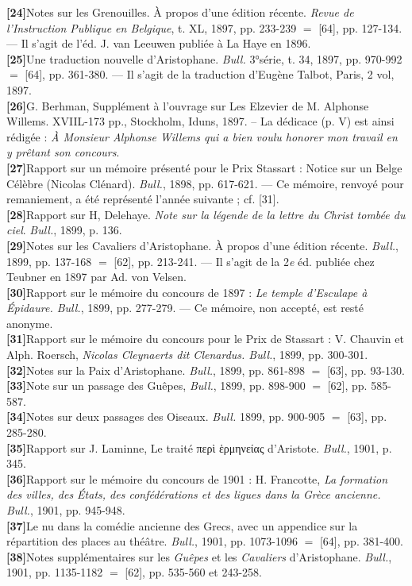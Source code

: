 \documentclass{book}%
\newcommand{\italique}[1]{\textit{#1}}%
\newcommand{\nieme}[1]{#1\italique{e}}%
\newcommand{\biblio}[2]{\hspace*{-1.5cm}\textbf{[#1]}\hspace*{1.5cm}#2\\

}
\begin{document}
\biblio{24}{Notes sur les Grenouilles. À propos d'une édition récente. \italique{Revue de l'Instruction Publique en Belgique}, t. XL, 1897, pp. 233-239 $=$ [64], pp. 127-134. — Il s'agit de l'éd. J. van Leeuwen publiée à La Haye en 1896.}%
\biblio{25}{Une traduction nouvelle d'Aristophane. \italique{Bull.} 3°série, t. 34, 1897, pp. 970-992 $=$ [64], pp. 361-380. — Il s'agit de la traduction d'Eugène Talbot, Paris, 2 vol, 1897.}%
\biblio{26}{G. Berhman, Supplément à l'ouvrage sur Les Elzevier de M. Alphonse Willems. XVIIL-173 pp., Stockholm, Iduns, 1897. -- La dédicace (p. V) est ainsi rédigée : \italique{À Monsieur Alphonse Willems qui a bien voulu honorer mon travail en y prêtant son concours}.}%
\biblio{27}{Rapport sur un mémoire présenté pour le Prix Stassart : Notice sur un Belge Célèbre (Nicolas Clénard). \italique{Bull.}, 1898, pp. 617-621. — Ce mémoire, renvoyé pour remaniement, a été représenté l'année suivante ; cf. [31].}%
\biblio{28}{Rapport sur H, Delehaye. \italique{Note sur la légende de la lettre du Christ tombée du ciel}. \italique{Bull.}, 1899, p. 136.}%
\biblio{29}{Notes sur les Cavaliers d'Aristophane. À propos d'une édition récente. \italique{Bull.}, 1899, pp. 137-168 $=$ [62], pp. 213-241. — Il s'agit de la \nieme{2} éd. publiée chez Teubner en 1897 par Ad. von Velsen.}%
\biblio{30}{Rapport sur le mémoire du concours de 1897 : \italique{Le temple d'Esculape à Épidaure. Bull.}, 1899, pp. 277-279. — Ce mémoire, non accepté, est resté anonyme.}%
\biblio{31}{Rapport sur le mémoire du concours pour le Prix de Stassart : V. Chauvin et Alph. Roersch, \italique{Nicolas Cleynaerts dit Clenardus. Bull.}, 1899, pp. 300-301.}%
\biblio{32}{Notes sur la Paix d'Aristophane. \italique{Bull.}, 1899, pp. 861-898 $=$ [63], pp. 93-130.}%
\biblio{33}{Note sur un passage des Guêpes, \italique{Bull.}, 1899, pp. 898-900 $=$ [62], pp. 585-587.}%
\biblio{34}{Notes sur deux passages des Oiseaux. \italique{Bull.} 1899, pp. 900-905 $=$ [63], pp. 285-280.}%
\biblio{35}{Rapport sur J. Laminne, Le traité περὶ ἑρμηνείας d'Aristote. \italique{Bull.}, 1901, p. 345.}%
\biblio{36}{Rapport sur le mémoire du concours de 1901 : H. Francotte, \italique{La formation des villes, des États, des confédérations et des ligues dans la Grèce ancienne. Bull.}, 1901, pp. 945-948.}%
\biblio{37}{Le nu dans la comédie ancienne des Grecs, avec un appendice sur la répartition des places au théâtre. \italique{Bull.}, 1901, pp. 1073-1096 $=$ [64], pp. 381-400.}%
\biblio{38}{Notes supplémentaires sur les \italique{Guêpes} et les \italique{Cavaliers} d'Aristophane. \italique{Bull.}, 1901, pp. 1135-1182 $=$ [62], pp. 535-560 et 243-258.}%
\end{document}
